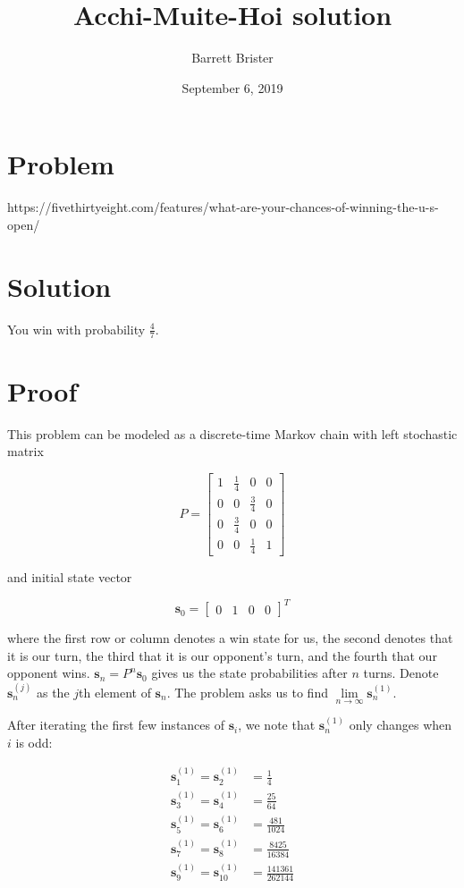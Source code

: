 \documentclass[]{article}
\title{Acchi-Muite-Hoi solution}
\author{Barrett Brister}
\date{September 6, 2019}
\begin{document}
\section{Problem}
https://fivethirtyeight.com/features/what-are-your-chances-of-winning-the-u-s-open/
	
\section{Solution}
You win with probability $\frac{4}{7}$.

\section{Proof}
This problem can be modeled as a discrete-time Markov chain with left stochastic matrix

\begin{equation}
P = \begin{bmatrix}
	1 & \frac{1}{4} & 0 & 0\\
	0 & 0 & \frac{3}{4} & 0\\
	0 & \frac{3}{4} & 0 & 0\\
	0 & 0 & \frac{1}{4} & 1
\end{bmatrix}
\end{equation}

and initial state vector

\begin{equation}
\mathbf{s}_0 = \begin{bmatrix}0 & 1 & 0 & 0\end{bmatrix}^T
\end{equation}

where the first row or column denotes a win state for us, the second denotes that it is our turn, the third that it is our opponent's turn, and the fourth that our opponent wins. $\mathbf{s}_n = P^n \mathbf{s}_0$ gives us the state probabilities after $n$ turns. Denote $\mathbf{s}_n^{(j)}$ as the $j$th element of $\mathbf{s}_n$. The problem asks us to find $\lim\limits_{n \rightarrow\infty} \mathbf{s}_n^{(1)}$.

After iterating the first few instances of $\mathbf{s}_i$, we note that $\mathbf{s}_n^{(1)}$ only changes when $i$ is odd:

\begin{equation}
	\begin{aligned}
	\mathbf{s}_1^{(1)} = \mathbf{s}_2^{(1)} &= \frac{1}{4}\\
	\mathbf{s}_3^{(1)} = \mathbf{s}_4^{(1)}  &= \frac{25}{64}\\
	\mathbf{s}_5^{(1)} = \mathbf{s}_6^{(1)}  &= \frac{481}{1024}\\
	\mathbf{s}_7^{(1)} = \mathbf{s}_8^{(1)}  &= \frac{8425}{16384}\\
	\mathbf{s}_9^{(1)} = \mathbf{s}_{10}^{(1)}  &= \frac{141361}{262144}\\
	\end{aligned}
\end{equation}
\end{document}
